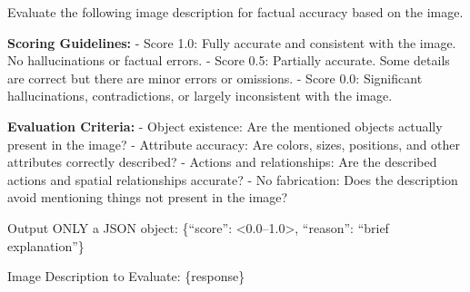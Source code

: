 
\begin{tcolorbox}[promptbox={\textsc{ResponseJudge}: Holistic response-level verification}]
Evaluate the following image description for factual accuracy based on the image.

\textbf{Scoring Guidelines:}\newline
- Score 1.0: Fully accurate and consistent with the image. No hallucinations or factual errors.\newline
- Score 0.5: Partially accurate. Some details are correct but there are minor errors or omissions.\newline
- Score 0.0: Significant hallucinations, contradictions, or largely inconsistent with the image.

\textbf{Evaluation Criteria:}\newline
- Object existence: Are the mentioned objects actually present in the image?\newline
- Attribute accuracy: Are colors, sizes, positions, and other attributes correctly described?\newline
- Actions and relationships: Are the described actions and spatial relationships accurate?\newline
- No fabrication: Does the description avoid mentioning things not present in the image?

\medskip
Output ONLY a JSON object:\newline
\{``score'': <0.0--1.0>, ``reason'': ``brief explanation''\}

\medskip
Image Description to Evaluate: \{response\}
\end{tcolorbox}

